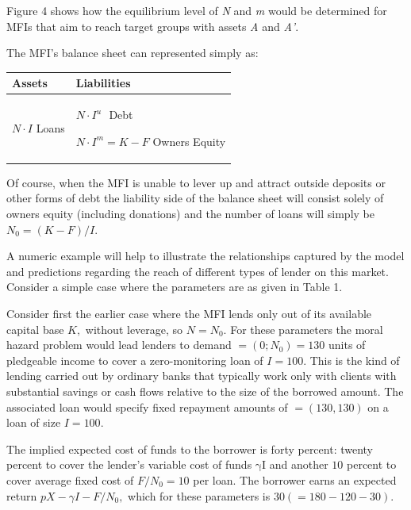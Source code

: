 \documentclass[
]{article}
\begin{document}
Figure 4 shows how the equilibrium level of \emph{N} and \emph{m} would
be determined for MFIs that aim to reach target groups with assets
\emph{A} and \emph{A'}.

The MFI's balance sheet can represented simply as:

\begin{longtable}[]{@{}ll@{}}
\toprule
\textbf{Assets} & \textbf{Liabilities}\tabularnewline
\midrule
\endhead
\begin{minipage}[t]{0.47\columnwidth}\raggedright
\(N \cdot I\mspace{6mu}\)Loans\strut
\end{minipage} & \begin{minipage}[t]{0.47\columnwidth}\raggedright
\(N \cdot I^{u}\mspace{6mu}\) Debt

\(N \cdot I^{m} = K - F\) Owners Equity\strut
\end{minipage}\tabularnewline
\bottomrule
\end{longtable}

Of course, when the MFI is unable to lever up and attract outside
deposits or other forms of debt the liability side of the balance sheet
will consist solely of owners equity (including donations) and the
number of loans will simply be \(N_{0} = (K - F)/I\).

A numeric example will help to illustrate the relationships captured by
the model and predictions regarding the reach of different types of
lender on this market. Consider a simple case where the parameters are
as given in Table 1.

Consider first the earlier case where the MFI lends only out of its
available capital base \(K,\) without leverage, so \(N = N_{0}\). For
these parameters the moral hazard problem would lead lenders to demand
\(= (0;N_{0}) = 130\) units of pledgeable income to cover a
zero-monitoring loan of \(I = 100\). This is the kind of lending carried
out by ordinary banks that typically work only with clients with
substantial savings or cash flows relative to the size of the borrowed
amount. The associated loan would specify fixed repayment amounts of
\(= (130,130)\) on a loan of size \(I = 100.\)

The implied expected cost of funds to the borrower is forty percent:
twenty percent to cover the lender's variable cost of funds
\(\text{γI}\) and another \(10\) percent to cover average fixed cost of
\(F/N_{0} = 10\) per loan. The borrower earns an expected return
\(pX - \gamma I - F/N_{0},\) which for these parameters is
\(30( = 180 - 120 - 30).\)
\end{document}
